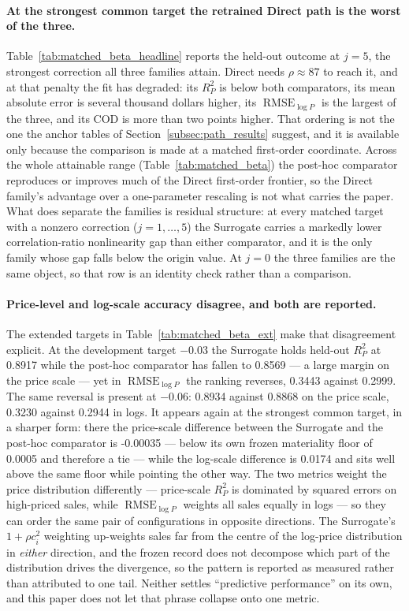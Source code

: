 \documentclass[10pt]{article}
\theoremstyle{definition}
\newcommand{\1}{\mathbf{1}}
\begin{document}
\paragraph{At the strongest common target the retrained Direct path is the worst of the
three.}
Table~\ref{tab:matched_beta_headline} reports the held-out outcome at $j=5$, the
strongest correction all three families attain. Direct needs $\rho\approx87$ to reach it, and at
that penalty the fit has degraded: its $R^2_P$ is below both comparators, its mean absolute error is
several thousand dollars higher, its $\operatorname{RMSE}_{\log P}$ is the largest of the three, and
its COD is more than two points higher. That ordering is not the one the anchor tables of
Section~\ref{subsec:path_results} suggest, and it is available only because the comparison is made
at a matched first-order coordinate. Across the whole attainable range
(Table~\ref{tab:matched_beta}) the post-hoc comparator reproduces or improves much of the Direct
first-order frontier, so the Direct family's advantage over a one-parameter rescaling is not what
carries the paper. What does separate the families is residual structure: at every matched target
with a nonzero correction ($j=1,\dots,5$) the Surrogate carries a markedly lower correlation-ratio
nonlinearity gap than either comparator, and it is the only family whose gap falls below the origin
value. At $j=0$ the three families are the same object, so that row is an identity check rather
than a comparison.

\paragraph{Price-level and log-scale accuracy disagree, and both are reported.}
The extended targets in Table~\ref{tab:matched_beta_ext} make that disagreement
explicit. At the development target $-0.03$ the Surrogate holds held-out $R^2_P$ at
0.8917 while the post-hoc comparator has fallen to 0.8569 --- a large margin on
the price scale --- yet in $\operatorname{RMSE}_{\log P}$ the ranking reverses, 0.3443
against 0.2999. The same reversal is present at $-0.06$: 0.8934 against
0.8868 on the price scale, 0.3230 against 0.2944 in logs. It appears
again at the strongest common target, in a sharper form: there the price-scale difference between
the Surrogate and the post-hoc comparator is -0.00035 --- below its own frozen materiality
floor of 0.0005 and therefore a tie --- while the log-scale difference is 0.0174 and
sits well above the same floor while pointing the other way. The two metrics weight the price
distribution differently --- price-scale $R^2_P$ is dominated by squared errors on high-priced
sales, while $\operatorname{RMSE}_{\log P}$ weights all sales equally in logs --- so they can order
the same pair of configurations in opposite directions. The Surrogate's $1+\rho c_i^2$ weighting
up-weights sales far from the centre of the log-price distribution in \emph{either} direction, and
the frozen record does not decompose which part of the distribution drives the divergence, so the
pattern is reported as measured rather than attributed to one tail. Neither settles
``predictive performance'' on its own, and this paper does not let that phrase collapse onto one
metric.
\end{document}
